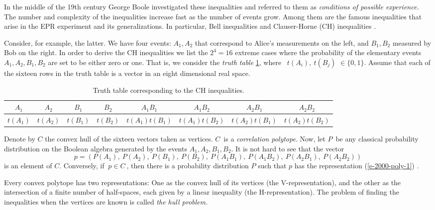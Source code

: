 In the middle of the 19th century George Boole \cite{Boole,Boole-62,Hailperin,pitowsky,Pit-94}
investigated
these inequalities
and referred to them as {\em conditions of possible experience. }
The number and complexity of the inequalities increase
fast as the number of events grow.
Among
them are the famous
inequalities that arise in the EPR experiment and its generalizations. In
particular,
Bell inequalities and Clauser-Horne (CH) inequalities \cite{bell,clauser}.

Consider, for example, the latter. We have four events: $A_{1},A_{2}$ that
correspond to Alice's
measurements on the left, and $B_{1},B_{2}$ measured by Bob on the right.
In order to derive the
CH inequalities we list the $2^4=16$ extreme cases where the probability of
the
elementary events $A_{1},A_{2},B_{1},B_{2}$ are set to be either zero or
one.
That is,
we consider the {\em truth table} \ref{t-tt-2000-poly},
where \ $t(A_{i}),\ t(B_{j})$ $\in \{0,1\}$. Assume that each of the sixteen
rows in the truth table is
a vector in an eight dimensional real space.
\begin{table}
\caption{Truth table corresponding to the CH inequalities. \label{t-tt-2000-poly}}
\begin{tabular}{cccccccc}
\hline\hline
$A_{1}$ & $A_{2}$ & $B_{1}$ & $B_{2}$&
$A_{1}B_{1}$& $A_{1}B_{2}$ &$A_{2}B_{1}$ & $A_{2}B_{2}$ \\
\hline
$t(A_{1})$ & $t(A_{2})$ & $t(B_{1})$ & $t(B_{2})$&
$t(A_{1})t(B_{1})$& $t(A_{1})t(B_{2})$ & $t(A_{2})t(B_{1})$ & $t(A_{2})t(B_{2})$ \\
\hline\hline
\end{tabular}
\end{table}
Denote by $C$ the convex
hull of the sixteen
vectors taken as vertices. $C$\ is a {\em correlation polytope}. Now, let
$P$\ be any classical probability
distribution on the Boolean algebra generated by the events $
A_{1},A_{2},B_{1},B_{2} $.
It is not hard to
see that the vector
\begin{equation}
p=(P(A_{1}),\ P(A_{2}),\ P(B_{1}),\ P(B_{2}),\ P(A_{1}B_{1}),\
P(A_{1}B_{2}),\ P(A_{2}B_{1}),\ P(A_{2}B_{2}))
\label{e-2000-poly-1}
\end{equation}
is an element of $C$.
Conversely, if $\ p\in C\ $, then there is a
probability distribution $P$ such
that $p$ has the representation (\ref{e-2000-poly-1}) \cite{pitowsky}.

Every convex polytope has  two
representations:
One as the convex hull of its vertices (the V-representation), and the other
as the intersection
of a finite number of half-spaces, each given by a linear inequality (the
H-representation).
The problem of finding the inequalities when the vertices are known is
called {\em the hull problem.}

